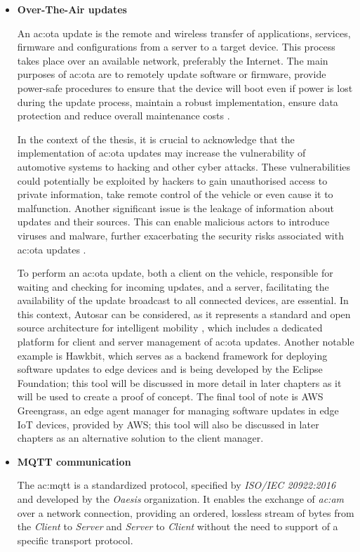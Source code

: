 \begin{itemize}
    \item[] \textbf{Over-The-Air updates}
    
    An \gls{ac:ota} update is the remote and wireless transfer of applications, services, firmware and configurations from a server to a target device. This process takes place over an available network, preferably the Internet. The main purposes of \gls{ac:ota} are to remotely update software or firmware, provide power-safe procedures to ensure that the device will boot even if power is lost during the update process, maintain a robust implementation, ensure data protection and reduce overall maintenance costs \cite{Open-sourceSWUpdate}.

    In the context of the thesis, it is crucial to acknowledge that the implementation of \gls{ac:ota} updates may increase the vulnerability of automotive systems to hacking and other cyber attacks. These vulnerabilities could potentially be exploited by hackers to gain unauthorised access to private information, take remote control of the vehicle or even cause it to malfunction. Another significant issue is the leakage of information about updates and their sources. This can enable malicious actors to introduce viruses and malware, further exacerbating the security risks associated with \gls{ac:ota} updates \cite{EnhancedMulti-LevelSecureUpdate}. 
    
    To perform an \gls{ac:ota} update, both a client on the vehicle, responsible for waiting and checking for incoming updates, and a server, facilitating the availability of the update broadcast to all connected devices, are essential. In this context, Autosar can be considered, as it represents a standard and open source architecture for intelligent mobility \cite{AutosarAbout}, which includes a dedicated platform for client and server management of \gls{ac:ota} updates. Another notable example is Hawkbit, which serves as a backend framework for deploying software updates to edge devices and is being developed by the Eclipse Foundation; this tool will be discussed in more detail in later chapters as it will be used to create a proof of concept. The final tool of note is AWS Greengrass, an edge agent manager for managing software updates in edge IoT devices, provided by AWS; this tool will also be discussed in later chapters as an alternative solution to the client manager.
    
    \item[] \textbf{MQTT communication}
    
    The \gls{ac:mqtt} is a standardized protocol, specified by \textit{ISO/IEC 20922:2016} and developed by the \textit{Oaesis} organization. It enables the exchange of \textit{\gls{ac:am}} over a network connection, providing an ordered, lossless stream of bytes from the \textit{Client} to \textit{Server} and \textit{Server} to \textit{Client} without the need to support of a specific transport protocol.


\end{itemize}
